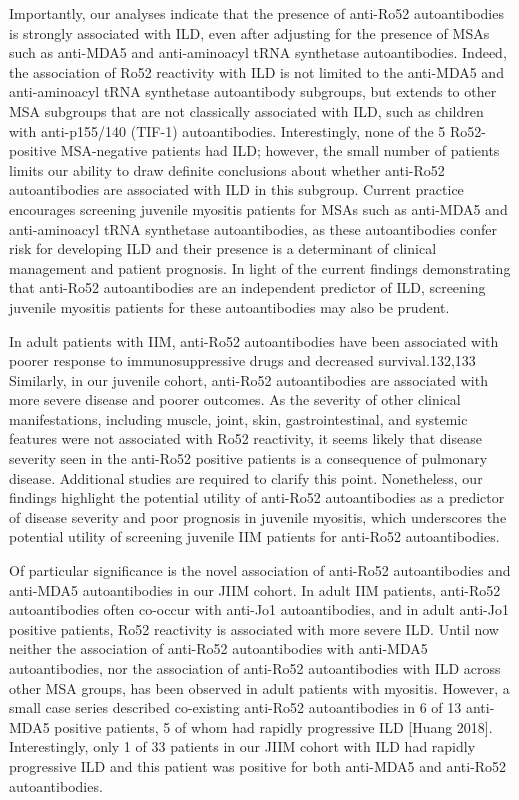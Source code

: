 Importantly, our analyses indicate that the presence of anti-Ro52 autoantibodies is strongly associated with ILD, even after adjusting for the presence of MSAs such as anti-MDA5 and anti-aminoacyl tRNA synthetase autoantibodies. Indeed, the association of Ro52 reactivity with ILD is not limited to the anti-MDA5 and anti-aminoacyl tRNA synthetase autoantibody subgroups, but extends to other MSA subgroups that are not classically associated with ILD, such as children with anti-p155/140 (TIF-1) autoantibodies.  Interestingly, none of the 5 Ro52-positive MSA-negative patients had ILD; however, the small number of patients limits our ability to draw definite conclusions about whether anti-Ro52 autoantibodies are associated with ILD in this subgroup.  Current practice encourages screening juvenile myositis patients for MSAs such as anti-MDA5 and anti-aminoacyl tRNA synthetase autoantibodies, as these autoantibodies confer risk for developing ILD and their presence is a determinant of clinical management and patient prognosis. In light of the current findings demonstrating that anti-Ro52 autoantibodies are an independent predictor of ILD, screening juvenile myositis patients for these autoantibodies may also be prudent.

In adult patients with IIM, anti-Ro52 autoantibodies have been associated with poorer response to immunosuppressive drugs and decreased survival.132,133 Similarly, in our juvenile cohort, anti-Ro52 autoantibodies are associated with more severe disease and poorer outcomes. As the severity of other clinical manifestations, including muscle, joint, skin, gastrointestinal, and systemic features were not associated with Ro52 reactivity, it seems likely that disease severity seen in the anti-Ro52 positive patients is a consequence of pulmonary disease. Additional studies are required to clarify this point.  Nonetheless, our findings highlight the potential utility of anti-Ro52 autoantibodies as a predictor of disease severity and poor prognosis in juvenile myositis, which underscores the potential utility of screening juvenile IIM patients for anti-Ro52 autoantibodies. 

Of particular significance is the novel association of anti-Ro52 autoantibodies and anti-MDA5 autoantibodies in our JIIM cohort. In adult IIM patients, anti-Ro52 autoantibodies often co-occur with anti-Jo1 autoantibodies, and in adult anti-Jo1 positive patients, Ro52 reactivity is associated with more severe ILD. Until now neither the association of anti-Ro52 autoantibodies with anti-MDA5 autoantibodies, nor the association of anti-Ro52 autoantibodies with ILD across other MSA groups, has been observed in adult patients with myositis. However, a small case series described co-existing anti-Ro52 autoantibodies in 6 of 13 anti-MDA5 positive patients, 5 of whom had rapidly progressive ILD [Huang 2018].  Interestingly, only 1 of 33 patients in our JIIM cohort with ILD had rapidly progressive ILD and this patient was positive for both anti-MDA5 and anti-Ro52 autoantibodies. 


